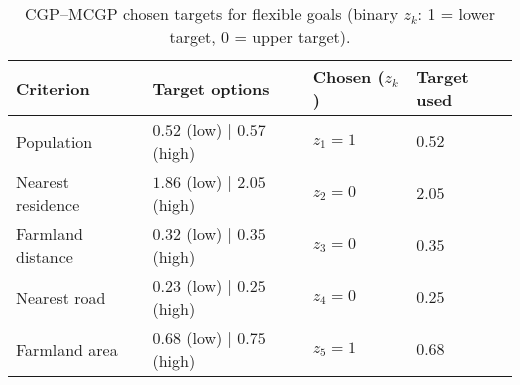 \begin{table}[htbp]
\centering
\caption{CGP--MCGP chosen targets for flexible goals (binary $z_k$: 1 = lower target, 0 = upper target).}
\label{tab:cgpMCGPTargets}
\begin{tabular}{llll}
\toprule
Criterion & Target options & Chosen ($z_k$) & Target used \\
\midrule
Population                 & $0.52$ (low) \;|\; $0.57$ (high) & $z_1=1$ & $0.52$ \\
Nearest residence          & $1.86$ (low) \;|\; $2.05$ (high) & $z_2=0$ & $2.05$ \\
Farmland distance          & $0.32$ (low) \;|\; $0.35$ (high) & $z_3=0$ & $0.35$ \\
Nearest road               & $0.23$ (low) \;|\; $0.25$ (high) & $z_4=0$ & $0.25$ \\
Farmland area              & $0.68$ (low) \;|\; $0.75$ (high) & $z_5=1$ & $0.68$ \\
\bottomrule
\end{tabular}
\end{table}